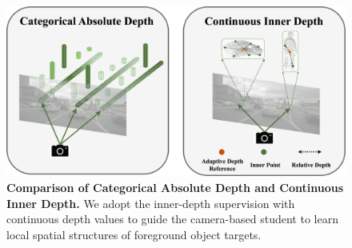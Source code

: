 \begin{figure}[!t]
    \centering
    \includegraphics[scale=0.042]{cvpr_2022/iccv_fig5.drawio.png}
    \caption{\textbf{Comparison of Categorical Absolute Depth and Continuous Inner Depth.} We adopt the inner-depth supervision with continuous depth values to guide the camera-based student to learn local spatial structures of foreground object targets.
    }
    \label{fig:relative_depth}
\end{figure}



